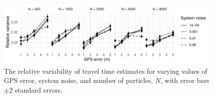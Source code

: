 \begin{figure}[tb]
    \centering
    \includegraphics[width=\textwidth]{figures/04_model_results_times.pdf}
    \caption{
        The relative variability of travel time estimates for varying
        values of GPS error, system noise, and number of particles, $N$,
        with error bars $\pm 2$ standard errors.
    }
    \label{fig:travel_times}
\end{figure}


